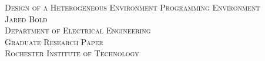 \begin{titlepage}

  \begin{center}
    \textsc{\LARGE Design of a Heterogeneous Environment Programming Environment}
    \\
    \textsc{Jared Bold}
    \\
    \textsc{Department of Electrical Engineering}
    \\
    \textsc{Graduate Research Paper}
    \\
    \textsc{Rochester Institute of Technology}
  \end{center}

\end{titlepage}
